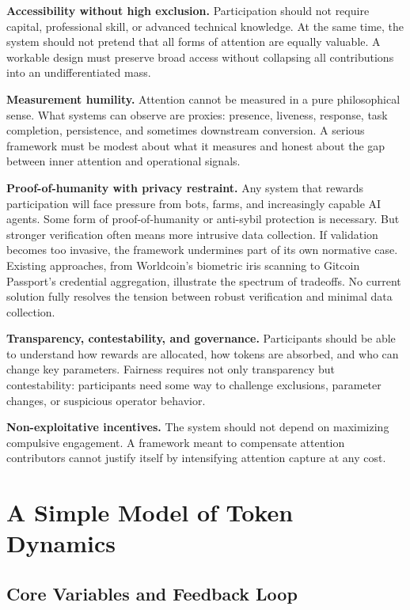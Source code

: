 \documentclass[12pt, a4paper]{article}
\begin{document}
\textbf{Accessibility without high exclusion.} Participation should not require capital, professional skill, or advanced technical knowledge. At the same time, the system should not pretend that all forms of attention are equally valuable. A workable design must preserve broad access without collapsing all contributions into an undifferentiated mass.

\textbf{Measurement humility.} Attention cannot be measured in a pure philosophical sense. What systems can observe are proxies: presence, liveness, response, task completion, persistence, and sometimes downstream conversion. A serious framework must be modest about what it measures and honest about the gap between inner attention and operational signals.

\textbf{Proof-of-humanity with privacy restraint.} Any system that rewards participation will face pressure from bots, farms, and increasingly capable AI agents. Some form of proof-of-humanity or anti-sybil protection is necessary. But stronger verification often means more intrusive data collection. If validation becomes too invasive, the framework undermines part of its own normative case. Existing approaches, from Worldcoin's biometric iris scanning to Gitcoin Passport's credential aggregation, illustrate the spectrum of tradeoffs. No current solution fully resolves the tension between robust verification and minimal data collection.

\textbf{Transparency, contestability, and governance.} Participants should be able to understand how rewards are allocated, how tokens are absorbed, and who can change key parameters. Fairness requires not only transparency but contestability: participants need some way to challenge exclusions, parameter changes, or suspicious operator behavior.

\textbf{Non-exploitative incentives.} The system should not depend on maximizing compulsive engagement. A framework meant to compensate attention contributors cannot justify itself by intensifying attention capture at any cost.


\section{A Simple Model of Token Dynamics}
\label{sec:model}

\subsection{Core Variables and Feedback Loop}
\label{sec:model-core}
\end{document}

